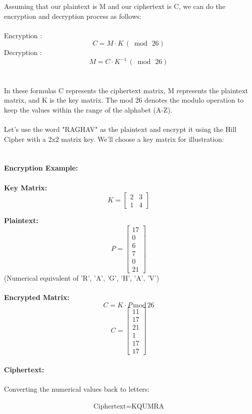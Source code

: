 \documentclass[11pt]{article}
\begin{document}
\begin{itemize}
Assuming that our plaintext is M and our ciphertext is C, we can do the encryption and decryption process as follows:\\\\
Encryption : \[ C = M \cdot K \, (\bmod \, 26) \]
Decryption :  \[ M = C \cdot K^{-1} \, (\bmod \, 26) \]
\\\\
In these formulas C represents the ciphertext matrix, M represents the plaintext matrix, and K is the key matrix. The mod 26 denotes the modulo operation to keep the values within the range of the alphabet (A-Z).
\\\\
Let's use the word "RAGHAV" as the plaintext and encrypt it using the Hill Cipher with a 2x2 matrix key. We'll choose a key matrix for illustration:\\\\
\\
\textbf{Encryption Example:}\\
\\
\textbf{Key Matrix:}
\\
\[ K = \begin{bmatrix} 2 & 3 \\ 1 & 4 \end{bmatrix} \]

\textbf{Plaintext:}
\\
\[ P = \begin{bmatrix} 17 \\ 0 \\ 6 \\ 7 \\ 0 \\ 21 \end{bmatrix} \]  (Numerical equivalent of 'R', 'A', 'G', 'H', 'A', 'V')\\
\\
\textbf{Encrypted Matrix:}
\\
\[ C = K \cdot P \, \text{mod} \, 26 \]
\[ C = \begin{bmatrix} 11 \\ 17 \\ 21 \\ 1 \\ 17 \\ 17 \end{bmatrix} \]
\\
\textbf{Ciphertext:}\\
\\
Converting the numerical values back to letters:\\
\\
\[ \text{Ciphertext} = \text{KQUMRA} \]


\end{itemize}
\end{document}
